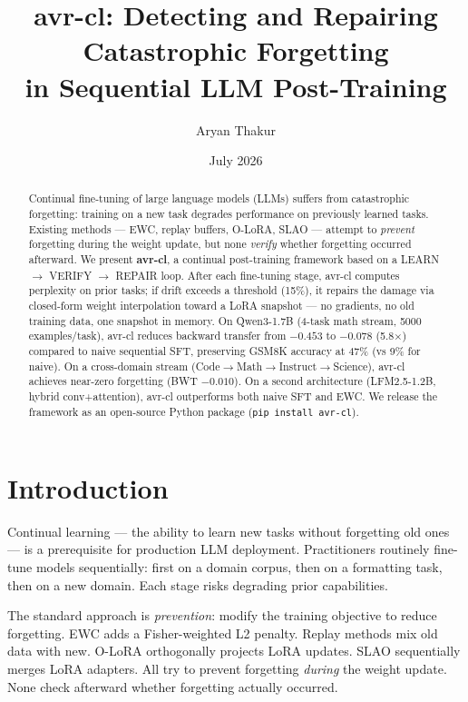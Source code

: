 \documentclass{article}
\title{avr-cl: Detecting and Repairing Catastrophic Forgetting \\
       in Sequential LLM Post-Training}
\author{Aryan Thakur}
\date{July 2026}
\begin{document}
\maketitle

\begin{abstract}
Continual fine-tuning of large language models (LLMs) suffers from catastrophic forgetting: training on a new task degrades performance on previously learned tasks. Existing methods — EWC, replay buffers, O-LoRA, SLAO — attempt to \emph{prevent} forgetting during the weight update, but none \emph{verify} whether forgetting occurred afterward. We present \textbf{avr-cl}, a continual post-training framework based on a LEARN $\to$ VERIFY $\to$ REPAIR loop. After each fine-tuning stage, avr-cl computes perplexity on prior tasks; if drift exceeds a threshold (15\%), it repairs the damage via closed-form weight interpolation toward a LoRA snapshot — no gradients, no old training data, one snapshot in memory. On Qwen3-1.7B (4-task math stream, 5000 examples/task), avr-cl reduces backward transfer from $-0.453$ to $-0.078$ (5.8$\times$) compared to naive sequential SFT, preserving GSM8K accuracy at 47\% (vs 9\% for naive). On a cross-domain stream (Code$\to$Math$\to$Instruct$\to$Science), avr-cl achieves near-zero forgetting (BWT $-0.010$). On a second architecture (LFM2.5-1.2B, hybrid conv+attention), avr-cl outperforms both naive SFT and EWC. We release the framework as an open-source Python package (\texttt{pip install avr-cl}).
\end{abstract}

\section{Introduction}

Continual learning — the ability to learn new tasks without forgetting old ones — is a prerequisite for production LLM deployment. Practitioners routinely fine-tune models sequentially: first on a domain corpus, then on a formatting task, then on a new domain. Each stage risks degrading prior capabilities.

The standard approach is \emph{prevention}: modify the training objective to reduce forgetting. EWC \cite{kirkpatrick2017ewc} adds a Fisher-weighted L2 penalty. Replay methods mix old data with new. O-LoRA \cite{wang2023olora} orthogonally projects LoRA updates. SLAO \cite{wang2024slao} sequentially merges LoRA adapters. All try to prevent forgetting \emph{during} the weight update. None check afterward whether forgetting actually occurred.
\end{document}
